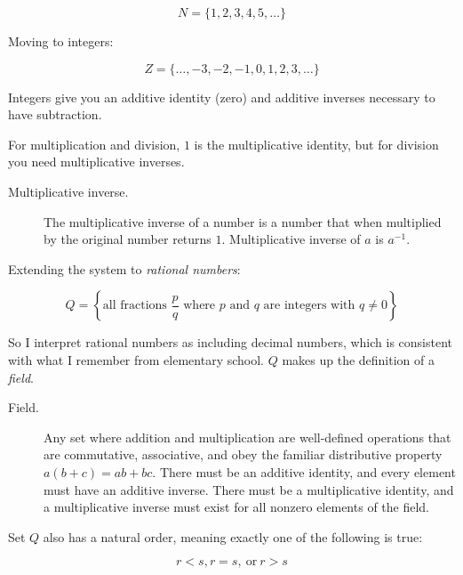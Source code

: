 \documentclass{article}
\numberwithin{equation}{subsection}
\numberwithin{theo}{subsection}
\begin{document}
\begin{equation*}
    N = \{1,2,3,4,5,\ldots\}
\end{equation*}

Moving to integers:

\begin{equation*}
    Z = \{\ldots, -3,-2,-1,0,1,2,3,\ldots\}
\end{equation*}

Integers give you an additive identity (zero) and additive inverses necessary to
have subtraction.

For multiplication and division, $1$ is the multiplicative identity, but for
division you need multiplicative inverses.

\begin{description}
    \item[Multiplicative inverse.] The multiplicative inverse of a number is a
number that when multiplied by the original number returns $1$. Multiplicative
inverse of $a$ is $a^{-1}$. 
\end{description}

Extending the system to \emph{rational numbers}:

\begin{equation*}
    Q = \left\{\text{all fractions $\frac{p}{q}$ where $p$ and $q$ are integers
    with $q \neq 0$}\right\}
\end{equation*}

So I interpret rational numbers as including decimal numbers, which is
consistent with what I remember from elementary school. $Q$ makes up the
definition of a \emph{field}.

\begin{description}
    \item[Field.] Any set where addition and multiplication are well-defined
operations that are commutative, associative, and obey the familiar distributive
property $a(b+c) = ab + bc$. There must be an additive identity, and every
element must have an additive inverse. There must be a multiplicative identity,
and a multiplicative inverse must exist for all nonzero elements of the field.
\end{description}

Set $Q$ also has a natural order, meaning exactly one of the following is true:

\begin{equation*}
    r<s, r = s,~ \text{or} ~r > s
\end{equation*}
\end{document}

